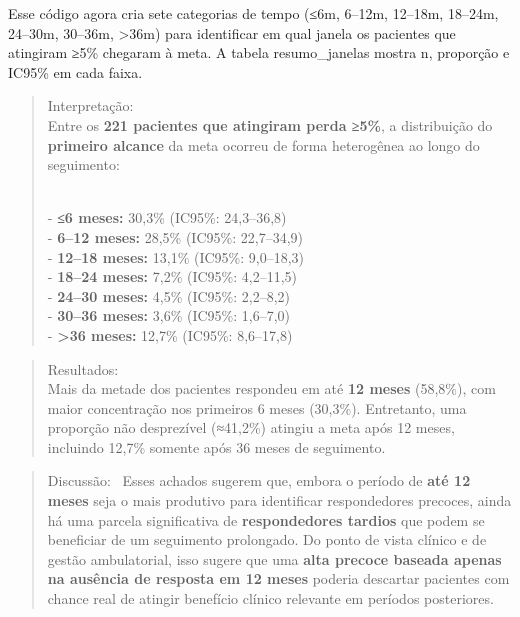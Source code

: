 \documentclass[
]{article}
\begin{document}
Esse código agora cria sete categorias de tempo (≤6m, 6--12m, 12--18m,
18--24m, 24--30m, 30--36m, \textgreater36m) para identificar em qual
janela os pacientes que atingiram ≥5\% chegaram à meta. A tabela
resumo\_janelas mostra n, proporção e IC95\% em cada faixa.

\begin{quote}
Interpretação:\\
Entre os \textbf{221 pacientes que atingiram perda ≥5\%}, a distribuição
do \textbf{primeiro alcance} da meta ocorreu de forma heterogênea ao
longo do seguimento:\\
\strut \\
- \textbf{≤6 meses:} 30,3\% (IC95\%: 24,3--36,8)\\
- \textbf{6--12 meses:} 28,5\% (IC95\%: 22,7--34,9)\\
- \textbf{12--18 meses:} 13,1\% (IC95\%: 9,0--18,3)\\
- \textbf{18--24 meses:} 7,2\% (IC95\%: 4,2--11,5)\\
- \textbf{24--30 meses:} 4,5\% (IC95\%: 2,2--8,2)\\
- \textbf{30--36 meses:} 3,6\% (IC95\%: 1,6--7,0)\\
- \textbf{\textgreater36 meses:} 12,7\% (IC95\%: 8,6--17,8)\\
\end{quote}

\begin{quote}
Resultados:\\
Mais da metade dos pacientes respondeu em até \textbf{12 meses}
(58,8\%), com maior concentração nos primeiros 6 meses (30,3\%).
Entretanto, uma proporção não desprezível (≈41,2\%) atingiu a meta após
12 meses, incluindo 12,7\% somente após 36 meses de seguimento.\\
\end{quote}

\begin{quote}
Discussão:~ Esses achados sugerem que, embora o período de \textbf{até
12 meses} seja o mais produtivo para identificar respondedores precoces,
ainda há uma parcela significativa de \textbf{respondedores tardios} que
podem se beneficiar de um seguimento prolongado. Do ponto de vista
clínico e de gestão ambulatorial, isso sugere que uma \textbf{alta
precoce baseada apenas na ausência de resposta em 12 meses} poderia
descartar pacientes com chance real de atingir benefício clínico
relevante em períodos posteriores.\\
\end{quote}
\end{document}
